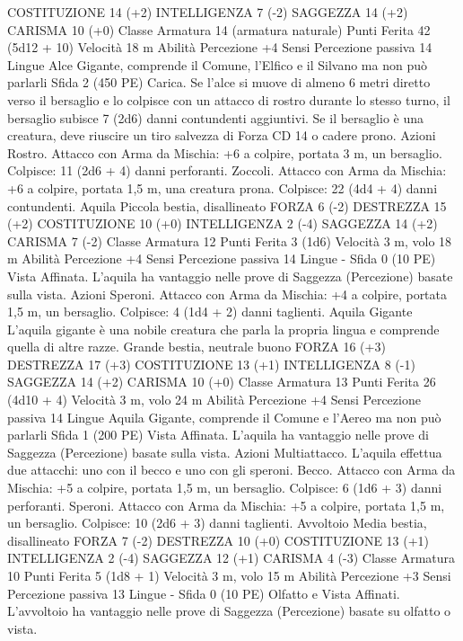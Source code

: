 \begin{multicols}{2}
COSTITUZIONE 14 (+2)
INTELLIGENZA 7 (-2)
SAGGEZZA 14 (+2)
CARISMA 10 (+0)
Classe Armatura 14 (armatura naturale)
Punti Ferita 42 (5d12 + 10)
Velocità 18 m
Abilità Percezione +4
Sensi Percezione passiva 14
Lingue Alce Gigante, comprende il Comune, l’Elfico e il
Silvano ma non può parlarli
Sfida 2 (450 PE)
Carica. Se l’alce si muove di almeno 6 metri diretto verso il
bersaglio e lo colpisce con un attacco di rostro durante lo stesso
turno, il bersaglio subisce 7 (2d6) danni contundenti aggiuntivi.
Se il bersaglio è una creatura, deve riuscire un tiro salvezza di
Forza CD 14 o cadere prono.
Azioni
Rostro. Attacco con Arma da Mischia: +6 a colpire, portata 3 m,
un bersaglio.
Colpisce: 11 (2d6 + 4) danni perforanti.
Zoccoli. Attacco con Arma da Mischia: +6 a colpire, portata 1,5
m, una creatura prona.
Colpisce: 22 (4d4 + 4) danni contundenti.
Aquila
Piccola bestia, disallineato
FORZA 6 (-2)
DESTREZZA 15 (+2)
COSTITUZIONE 10 (+0)
INTELLIGENZA 2 (-4)
SAGGEZZA 14 (+2)
CARISMA 7 (-2)
Classe Armatura 12
Punti Ferita 3 (1d6)
Velocità 3 m, volo 18 m
Abilità Percezione +4
Sensi Percezione passiva 14
Lingue -
Sfida 0 (10 PE)
Vista Affinata. L’aquila ha vantaggio nelle prove di Saggezza
(Percezione) basate sulla vista.
Azioni
Speroni. Attacco con Arma da Mischia: +4 a colpire, portata 1,5
m, un bersaglio.
Colpisce: 4 (1d4 + 2) danni taglienti.
Aquila Gigante
L’aquila gigante è una nobile creatura che parla la
propria lingua e comprende quella di altre razze.
Grande bestia, neutrale buono
FORZA 16 (+3)
DESTREZZA 17 (+3)
COSTITUZIONE 13 (+1)
INTELLIGENZA 8 (-1)
SAGGEZZA 14 (+2)
CARISMA 10 (+0)
Classe Armatura 13
Punti Ferita 26 (4d10 + 4)
Velocità 3 m, volo 24 m
Abilità Percezione +4
Sensi Percezione passiva 14
Lingue Aquila Gigante, comprende il Comune e l’Aereo ma non
può parlarli
Sfida 1 (200 PE)
Vista Affinata. L’aquila ha vantaggio nelle prove di Saggezza
(Percezione) basate sulla vista.
Azioni
Multiattacco. L’aquila effettua due attacchi: uno con il becco e
uno con gli speroni.
Becco. Attacco con Arma da Mischia: +5 a colpire, portata 1,5
m, un bersaglio.
Colpisce: 6 (1d6 + 3) danni perforanti.
Speroni. Attacco con Arma da Mischia: +5 a colpire, portata 1,5
m, un bersaglio.
Colpisce: 10 (2d6 + 3) danni taglienti.
Avvoltoio
Media bestia, disallineato
FORZA 7 (-2)
DESTREZZA 10 (+0)
COSTITUZIONE 13 (+1)
INTELLIGENZA 2 (-4)
SAGGEZZA 12 (+1)
CARISMA 4 (-3)
Classe Armatura 10
Punti Ferita 5 (1d8 + 1)
Velocità 3 m, volo 15 m
Abilità Percezione +3
Sensi Percezione passiva 13
Lingue -
Sfida 0 (10 PE)
Olfatto e Vista Affinati. L’avvoltoio ha vantaggio nelle prove di
Saggezza (Percezione) basate su olfatto o vista.

\end{multicols}
